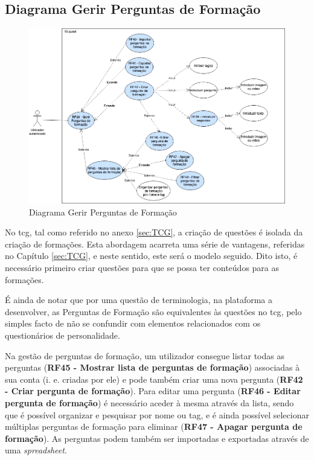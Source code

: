 \subsection{Diagrama Gerir Perguntas de Formação}
\label{d:perguntastcg}
\begin{figure}[ht!]
	\begin{center}
		\includegraphics[width=1\textwidth]{img/rf/gerir-perguntas-tcg}
		\caption{Diagrama Gerir Perguntas de Formação}
		\label{fig:rf-gerir-perguntas-tcg}
	\end{center}
\end{figure}

No \acrshort{tcg}, tal como referido no anexo \ref{sec:TCG}, a criação de questões é isolada da criação de formações. Esta abordagem acarreta uma série de vantagens, referidas no Capítulo \ref{sec:TCG}, e neste sentido, este será o modelo seguido. Dito isto, é necessário primeiro criar questões para que se possa ter conteúdos para as formações. 

É ainda de notar que por uma questão de terminologia, na plataforma a desenvolver, as Perguntas de Formação são equivalentes às questões no \acrshort{tcg}, pelo simples facto de não se confundir com elementos relacionados com os questionários de personalidade.

Na gestão de perguntas de formação, um utilizador consegue listar todas as perguntas (\textbf{RF45 - Mostrar lista de perguntas de formação}) associadas à sua conta (i. e. criadas por ele) e pode também criar uma nova pergunta (\textbf{RF42 - Criar pergunta de formação}). Para editar uma pergunta (\textbf{RF46 - Editar pergunta de formação}) é necessário aceder à mesma através da lista, sendo que é possível organizar e pesquisar por nome ou tag, e é ainda possível selecionar múltiplas perguntas de formação para eliminar (\textbf{RF47 - Apagar pergunta de formação}). As perguntas podem também ser importadas e exportadas através de uma \textit{spreadsheet}.

